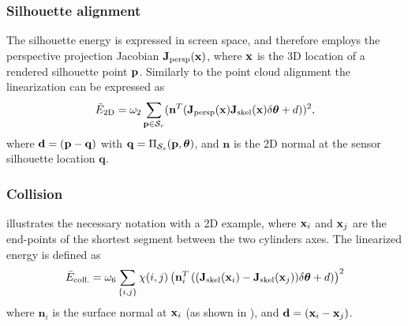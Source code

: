 \subsubsection*{Silhouette alignment} The silhouette energy is expressed in screen space, and therefore employs the perspective projection Jacobian $\mathbf{J}_{\text{persp}}(\mathbf{x})$, where $\mathbf{x}$ is the 3D location of a rendered silhouette point $\mathbf{p}$. Similarly to the point cloud alignment the linearization can be expressed as
\begin{equation*}
\bar{E}_{\text{2D}} = \omega_2 \sum_{\mathbf{p} \in \mathcal{S}_{r}} (\mathbf{n}^T(\mathbf{J}_{\text{persp}}(\mathbf{x}) \mathbf{J}_{\text{skel}}(\mathbf{x}) \delta\boldsymbol{\theta} + d))^2,
\end{equation*}
where $\mathbf{d} = (\mathbf{p} - \mathbf{q})$ with $\mathbf{q} = \Pi_{\mathcal{S}_{s}} (\mathbf{p},\boldsymbol{\theta})$, and $\mathbf{n}$ is the 2D normal at the sensor silhouette location $\mathbf{q}$.
% 
% 
%  
% 
%

\subsubsection*{Collision}  illustrates the necessary notation with a 2D example, where $\mathbf{x}_i$ and $\mathbf{x}_j$ are the end-points of the shortest segment between the two cylinders axes. The linearized energy is defined as
% 
\begin{equation*}
\bar{E}_{\text{coll.}} = \omega_6 \sum_{\{i,j\}} \chi(i,j)\left(\mathbf{n}_i^T\left((\mathbf{J}_{\text{skel}}(\mathbf{x}_i) - \mathbf{J}_{\text{skel}}(\mathbf{x}_j)) \delta\boldsymbol{\theta} + d\right)\right)^2
\end{equation*}
%
where $\mathbf{n}_i$ is the surface normal at $\mathbf{x}_i$ (as shown in ), and $\mathbf{d} = (\mathbf{x}_i - \mathbf{x}_j)$. 
%  
% 
%  

